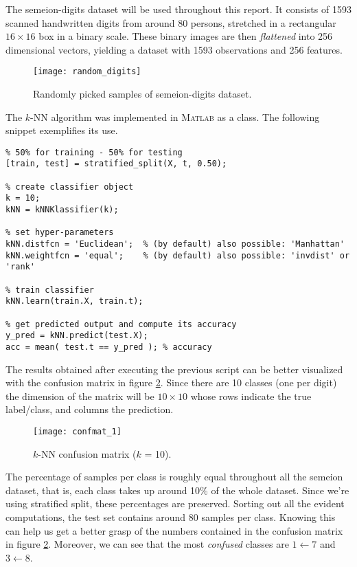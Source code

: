 The semeion-digits dataset will be used throughout this report. It consists of 1593 scanned handwritten digits from around 80 persons, stretched in a rectangular $16\times16$ box in a binary scale. These binary images are then \textit{flattened} into 256 dimensional vectors, yielding a dataset with 1593 observations and 256 features.
\begin{figure}[]
	\centering
	\texttt{[image: random\_digits]}
	\caption{Randomly picked samples of semeion-digits dataset.}
	\label{fig:random_digits}
\end{figure}

The $k$-NN algorithm was implemented in \textsc{Matlab} as a class. The following snippet exemplifies its use.
\begin{lstlisting}
% 50% for training - 50% for testing 
[train, test] = stratified_split(X, t, 0.50);

% create classifier object
k = 10;
kNN = kNNKlassifier(k);

% set hyper-parameters
kNN.distfcn = 'Euclidean';  % (by default) also possible: 'Manhattan'
kNN.weightfcn = 'equal';    % (by default) also possible: 'invdist' or 'rank'

% train classifier
kNN.learn(train.X, train.t);

% get predicted output and compute its accuracy
y_pred = kNN.predict(test.X);
acc = mean( test.t == y_pred );	% accuracy
\end{lstlisting}

The results obtained after executing the previous script can be better visualized with the confusion matrix in figure \ref{fig:confmat_1}. Since there are 10 classes (one per digit) the dimension of the matrix will be $10 \times 10$ whose rows indicate the true label/class, and columns the prediction.
\begin{figure}
	\centering
	\texttt{[image: confmat\_1]}
	\caption{$k$-NN confusion matrix ($k$ = 10).}
	\label{fig:confmat_1}
\end{figure}

The percentage of samples per class is roughly equal throughout all the semeion dataset, that is, each class takes up around 10\% of the whole dataset. Since we're using stratified split, these percentages are preserved. Sorting out all the evident computations, the test set contains around 80 samples per class. Knowing this can help us get a better grasp of the numbers contained in the confusion matrix in figure \ref{fig:confmat_1}. Moreover, we can see that the most \textit{confused} classes are $1 \gets 7$ and $3 \gets 8$.

